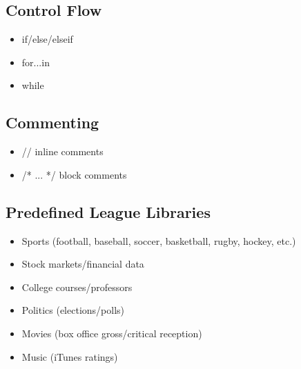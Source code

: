 \documentclass[12pt]{article}
\begin{document}
\subsection{Control Flow}
\begin{itemize}
\setlength{\itemsep}{1pt}
\item if/else/elseif
\item for...in
\item while
\end{itemize}

\subsection{Commenting}
\begin{itemize}
\setlength{\itemsep}{1pt}
\item // inline comments
\item /* ... */ block comments
\end{itemize}

\subsection{Predefined League Libraries}
\begin{itemize}
\setlength{\itemsep}{1pt}
\item Sports (football, baseball, soccer, basketball, rugby, hockey, etc.)
\item Stock markets/financial data
\item College courses/professors
\item Politics (elections/polls)
\item Movies (box office gross/critical reception)
\item Music (iTunes ratings)
\end{itemize}
\end{document}

